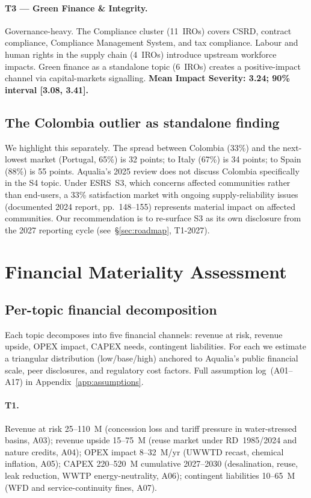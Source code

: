 \documentclass[11pt, a4paper]{article}
\newcommand{\euro}{\texteuro}
\newcommand{\sig}[1]{\textbf{#1}}
\begin{document}
\paragraph{T3 --- Green Finance \& Integrity.}
Governance-heavy. The Compliance cluster (11~IROs) covers CSRD, contract compliance, Compliance Management System, and tax compliance. Labour and human rights in the supply chain (4~IROs) introduce upstream workforce impacts. Green finance as a standalone topic (6~IROs) creates a positive-impact channel via capital-markets signalling. \sig{Mean Impact Severity: 3.24; 90\% interval [3.08, 3.41].}

\subsection{The Colombia outlier as standalone finding}

We highlight this separately. The spread between Colombia (33\%) and the next-lowest market (Portugal, 65\%) is 32 points; to Italy (67\%) is 34 points; to Spain (88\%) is 55 points. Aqualia's 2025 review does not discuss Colombia specifically in the S4 topic. Under ESRS~S3, which concerns affected communities rather than end-users, a 33\% satisfaction market with ongoing supply-reliability issues (documented 2024 report, pp.~148--155) represents material impact on affected communities. Our recommendation is to re-surface S3 as its own disclosure from the 2027 reporting cycle (see~\S\ref{sec:roadmap}, T1-2027).

\section{Financial Materiality Assessment}
\label{sec:financial}

\subsection{Per-topic financial decomposition}

Each topic decomposes into five financial channels: revenue at risk, revenue upside, OPEX impact, CAPEX needs, contingent liabilities. For each we estimate a triangular distribution (low/base/high) anchored to Aqualia's public financial scale, peer disclosures, and regulatory cost factors. Full assumption log~(A01--A17) in Appendix~\ref{app:assumptions}.

\paragraph{T1.}
Revenue at risk \euro{}25--110~M (concession loss and tariff pressure in water-stressed basins, A03); revenue upside \euro{}15--75~M (reuse market under RD~1985/2024 and nature credits, A04); OPEX impact \euro{}8--32~M/yr (UWWTD recast, chemical inflation, A05); CAPEX \euro{}220--520~M cumulative 2027--2030 (desalination, reuse, leak reduction, WWTP energy-neutrality, A06); contingent liabilities \euro{}10--65~M (WFD and service-continuity fines, A07).
\end{document}
